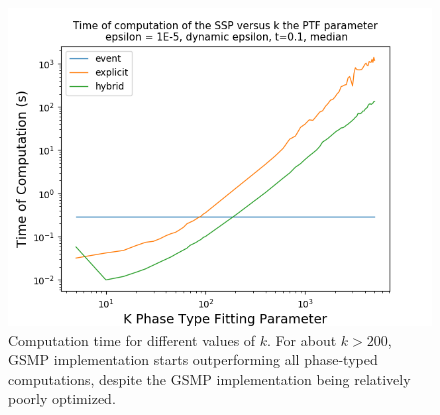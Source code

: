 \documentclass[paper=a4, fontsize=11pt]{scrartcl}
\numberwithin{equation}{section}		%
\numberwithin{figure}{section}			%
\numberwithin{table}{section}				%
\begin{document}
\begin{figure}
	\centering
	\includegraphics[width=16cm]{picture/New_model/performance_versus_k.png}
	\caption{Computation time for different values of $k$. For about $k>200$, GSMP implementation starts outperforming all phase-typed computations, despite the GSMP implementation being relatively poorly optimized.}
	\label{fig:performance}
\end{figure}


\end{document}
